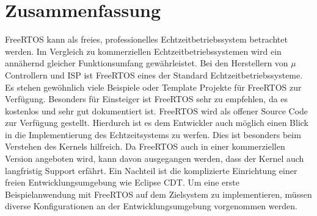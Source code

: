 \section{Zusammenfassung}
FreeRTOS kann als freies, professionelles Echtzeitbetriebssystem betrachtet werden. Im Vergleich zu kommerziellen Echtzeitbetriebssystemen wird ein annähernd gleicher Funktionsumfang gewährleistet. Bei den Herstellern von $\mu$Controllern und ISP ist FreeRTOS eines der Standard Echtzeitbetriebssysteme. Es stehen gewöhnlich viele Beispiele oder Template Projekte für FreeRTOS zur Verfügung.  Besonders für Einsteiger ist FreeRTOS sehr zu empfehlen, da es kostenlos und sehr gut dokumentiert ist. FreeRTOS wird als offener Source Code zur Verfügung gestellt. Hierdurch ist es dem Entwickler auch möglich einen Blick in die Implementierung des Echtzeitsystems zu werfen. Dies ist besonders beim Verstehen des Kernels hilfreich. Da FreeRTOS auch in einer kommerziellen Version angeboten wird, kann davon ausgegangen werden, dass der Kernel auch langfristig Support erfährt. Ein Nachteil ist die komplizierte Einrichtung einer freien Entwicklungsumgebung wie Eclipse CDT. Um eine erste Beispielanwendung mit FreeRTOS auf dem Zielsystem zu implementieren, müssen diverse Konfigurationen an der Entwicklungsumgebung vorgenommen werden.

